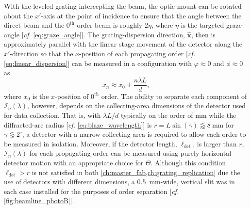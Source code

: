 With the leveled grating intercepting the beam, the optic mount can be rotated about the $x'$-axis at the point of incidence to ensure that the angle between the direct beam and the $0^{\text{th}}$-order beam is roughly $2 \eta$, where $\eta$ is the targeted graze angle [\emph{cf.\@} \cref{eq:graze_angle}]. 
The grating-dispersion direction, $\mathbold{\hat{x}}$, then is approximately parallel with the linear stage movement of the detector along the $x'$-direction so that the $x$-position of each propagating order [\emph{cf.\@} \cref{eq:linear_dispersion}] can be measured in a configuration with $\varphi \approx 0$ and $\phi \approx 0$ as
\begin{equation}\label{eq:disp_approx}
 x_n \approx x_0 + \frac{n \lambda L}{d} ,
 \end{equation}
where $x_0$ is the $x$-position of $0^{\text{th}}$ order. 
The ability to separate each component of $\mathcal{I}_n \! \left( \lambda \right)$, however, depends on the collecting-area dimensions of the detector used for data collection. 
That is, with $\lambda L / d$ typically on the order of \si{\mm} while the diffracted-arc radius [\emph{cf.\@} \cref{eq:blaze_wavelength}] is $r = L \sin \left( \gamma \right) \lessapprox \SI{8}{\mm}$ for $\gamma \lessapprox 2^{\circ}$, %
a detector with a narrow collecting area is required to allow each order to be measured in isolation. 
Moreover, if the detector length, $\ell_{\text{det}}$, is larger than $r$, $\mathcal{I}_n \! \left( \lambda \right)$ for each propagating order can be measured using purely horizontal detector motion with an appropriate choice for $\Theta$. 
Although this condition $\ell_{\text{det}} > r$ is not satisfied in both \cref{ch:master_fab,ch:grating_replication} due the use of detectors with different dimensions, a \SI{0.5}{\mm}-wide, vertical slit was in each case installed for the purposes of order separation [\emph{cf.\@} \cref{fig:beamline_photoB}]. %

